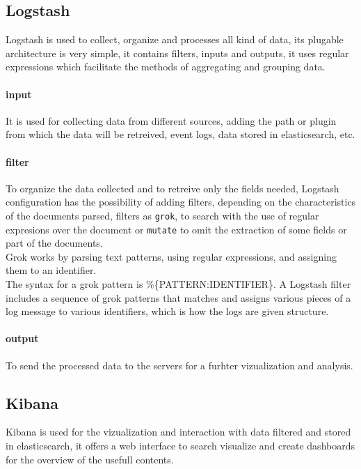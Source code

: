 \subsection{Logstash}

Logstash is used to collect, organize and processes all kind of data, its plugable architecture is very simple, it contains filters, inputs and outputs, it uses regular expressions which facilitate the methods of aggregating and grouping data.

\paragraph{input} It is used for collecting data from different sources, adding the path or plugin from which the data will be retreived, \eg event logs, data stored in elasticsearch, etc.
\paragraph{filter} To organize the data collected and to retreive only the fields needed, Logstash configuration has the possibility of adding filters, depending on the characteristics of the documents parsed, filters as \texttt{grok}, to search with the use of regular expresions over the document or \texttt{mutate} to omit the extraction of some fields or part of the documents. 
\\

Grok works by parsing text patterns, using regular expressions, and assigning them to an identifier.
\\

The syntax for a grok pattern is \%\{PATTERN:IDENTIFIER\}. A Logstash filter includes a sequence of grok patterns that matches and assigns various pieces of a log message to various identifiers, which is how the logs are given structure\cite{1}.

\paragraph{output} To send the processed data to the servers for a furhter vizualization and analysis.

\subsection{Kibana}

Kibana is used for the vizualization and interaction with data filtered and stored in elasticsearch, it offers a web interface to search visualize and create dashboards for the overview of the usefull contents.
\\


